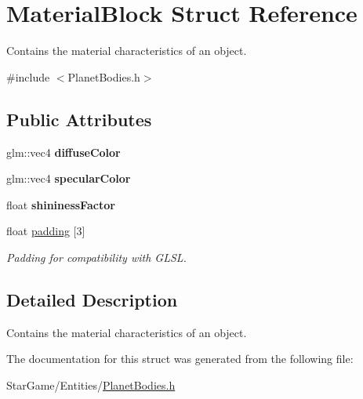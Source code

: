 \hypertarget{struct_material_block}{\section{Material\-Block Struct Reference}
\label{struct_material_block}
}


Contains the material characteristics of an object.  




{\ttfamily \#include $<$Planet\-Bodies.\-h$>$}

\subsection*{Public Attributes}
\begin{DoxyCompactItemize}
\item 
\hypertarget{struct_material_block_ae919d3a6fd049ec36d28b6050574755d}{glm\-::vec4 {\bfseries diffuse\-Color}}\label{struct_material_block_ae919d3a6fd049ec36d28b6050574755d}

\item 
\hypertarget{struct_material_block_a4d48252464fc063fc8fc629f67b72614}{glm\-::vec4 {\bfseries specular\-Color}}\label{struct_material_block_a4d48252464fc063fc8fc629f67b72614}

\item 
\hypertarget{struct_material_block_a96fd9a221a42885de099254498389f43}{float {\bfseries shininess\-Factor}}\label{struct_material_block_a96fd9a221a42885de099254498389f43}

\item 
\hypertarget{struct_material_block_a9de448d4d957faf4e125fbaf0a326b49}{float \hyperlink{struct_material_block_a9de448d4d957faf4e125fbaf0a326b49}{padding} \mbox{[}3\mbox{]}}\label{struct_material_block_a9de448d4d957faf4e125fbaf0a326b49}

\begin{DoxyCompactList}\small\item\em Padding for compatibility with G\-L\-S\-L. \end{DoxyCompactList}\end{DoxyCompactItemize}


\subsection{Detailed Description}
Contains the material characteristics of an object. 

The documentation for this struct was generated from the following file\-:\begin{DoxyCompactItemize}
\item 
Star\-Game/\-Entities/\hyperlink{_planet_bodies_8h}{Planet\-Bodies.\-h}\end{DoxyCompactItemize}
